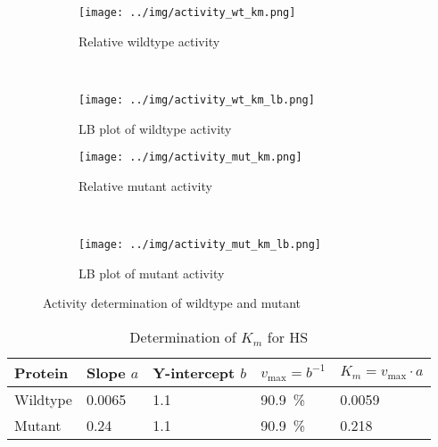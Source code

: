 \begin{figure*}
	\centering
	\begin{subfigure}{0.4\textwidth}
		\texttt{[image: ../img/activity\_wt\_km.png]}
		\caption{Relative wildtype activity}
		\label{fig:activity_wt_km}
	\end{subfigure}
	~
	\begin{subfigure}{0.4\textwidth}
		\centering
		\texttt{[image: ../img/activity\_wt\_km\_lb.png]}
		\caption{LB plot of wildtype activity}
		\label{fig:activity_wt_km_lb}
	\end{subfigure}

	\begin{subfigure}{0.4\textwidth}
		\texttt{[image: ../img/activity\_mut\_km.png]}
		\caption{Relative mutant activity}
		\label{fig:activity_mut_km}
	\end{subfigure}
	~
	\begin{subfigure}{0.4\textwidth}
		\centering
		\texttt{[image: ../img/activity\_mut\_km\_lb.png]}
		\caption{LB plot of mutant activity}
		\label{fig:activity_mut_km_lb}
	\end{subfigure}

	\caption{Activity determination of wildtype and mutant}
	\label{fig:activity}
\end{figure*}

\begin{table*}
	\centering
	\begin{tabu}{lllll}
		\toprule
		Protein & Slope $a$ & Y-intercept $b$ & $v_{\text{max}} = b^{-1}$ & $K_m = v_{\text{max}} \cdot a$ \\
		\midrule
		Wildtype & 0.0065 & 1.1 & \SI{90.9}{\percent} & \SI{0.0059}{\micro\Molar} \\
		Mutant & 0.24 & 1.1 & \SI{90.9}{\percent} & \SI{0.218}{\micro\Molar} \\
		\bottomrule
	\end{tabu}
	\caption{Determination of $K_m$ for HS}
	\label{tbl:activity_km}
\end{table*}

